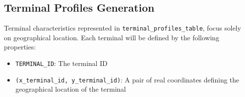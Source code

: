     

    \hypertarget{terminal-profiles-generation}{%
\subsection{Terminal Profiles
Generation}\label{terminal-profiles-generation}}

    Terminal characteristics represented in
\texttt{terminal\_profiles\_table}, focus solely on geographical
location. Each terminal will be defined by the following properties:

\begin{itemize}
\tightlist
\item
  \texttt{TERMINAL\_ID}: The terminal ID
\item
  \texttt{(x\_terminal\_id,\ y\_terminal\_id)}: A pair of real
  coordinates defining the geographical location of the terminal
\end{itemize}

